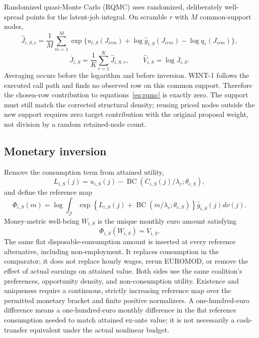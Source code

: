 \documentclass[11pt,a4paper]{article}
\newcommand{\BC}{\operatorname{BC}}
\begin{document}
Randomized quasi-Monte Carlo (RQMC) uses randomized, deliberately well-spread
points for the latent-job integral. On scramble $r$ with $M$ common-support
nodes,
\begin{equation}
\widehat J_{i,S,r}=\frac1M\sum_{m=1}^{M}
\exp\{u_{i,S}(J_{irm})+\log\widehat g_{i,S}(J_{irm})
-\log q_r(J_{irm})\},
\end{equation}
\begin{equation}
\overline J_{i,S}=\frac1K\sum_{r=1}^{K}\widehat J_{i,S,r},
\qquad \widehat V_{i,S}=\log\overline J_{i,S}.
\label{eq:rqmc}
\end{equation}
Averaging occurs before the logarithm and before inversion. WINT-1 follows the
executed call path and finds no observed row on this common support. Therefore
the chosen-row contribution to equations~\eqref{eq:rqmc} is exactly zero. The
support must still match the corrected structural density; reusing priced nodes
outside the new support requires zero target contribution with the original
proposal weight, not division by a random retained-node count.

\subsection{Monetary inversion}

Remove the consumption term from attained utility,
\begin{equation}
L_{i,S}(j)=u_{i,S}(j)-
\BC(C_{i,S}(j)/\lambda_c;\theta_{c,S}),
\end{equation}
and define the reference map
\begin{equation}
\Phi_{i,S}(m)=\log\int_{\mathcal J}
\exp\!\left\{L_{i,S}(j)+\BC(m/\lambda_c;\theta_{c,S})\right\}
\widehat g_{i,S}(j)d\nu(j).
\label{eq:phi}
\end{equation}
Money-metric well-being $W_{i,S}$ is the unique monthly euro amount satisfying
\begin{equation}
\Phi_{i,S}(W_{i,S})=V_{i,S}.
\label{eq:invert}
\end{equation}
The same flat disposable-consumption amount is inserted at every reference
alternative, including non-employment. It replaces consumption in the
comparator; it does not replace hourly wages, rerun EUROMOD, or remove the effect
of actual earnings on attained value. Both sides use the same coalition's
preferences, opportunity density, and non-consumption utility. Existence and
uniqueness require a continuous, strictly increasing reference map over the
permitted monetary bracket and finite positive normalizers. A one-hundred-euro
difference means a one-hundred-euro monthly difference in the flat reference
consumption needed to match attained ex-ante value; it is not necessarily a
cash-transfer equivalent under the actual nonlinear budget.
\end{document}
